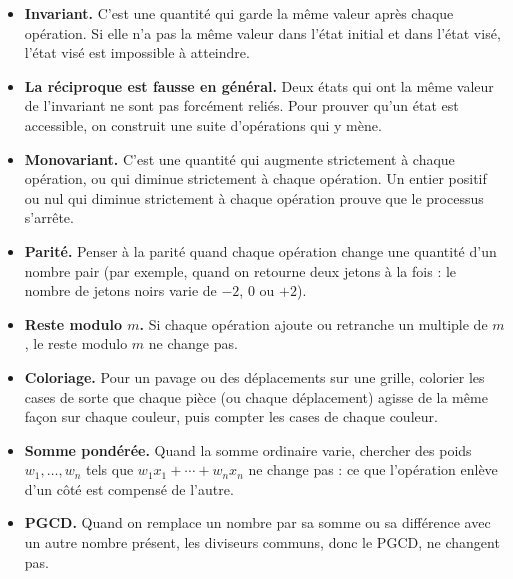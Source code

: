 \begin{itemize}
    \item \textbf{Invariant.} C'est une quantité qui garde la même valeur après
    chaque opération. Si elle n'a pas la même valeur dans l'état initial et
    dans l'état visé, l'état visé est impossible à atteindre.

    \item \textbf{La réciproque est fausse en général.} Deux états qui ont la
    même valeur de l'invariant ne sont pas forcément reliés. Pour prouver
    qu'un état est accessible, on construit une suite d'opérations qui y mène.

    \item \textbf{Monovariant.} C'est une quantité qui augmente strictement à
    chaque opération, ou qui diminue strictement à chaque opération. Un
    entier positif ou nul qui diminue strictement à chaque opération prouve que
    le processus s'arrête.

    \item \textbf{Parité.} Penser à la parité quand chaque opération change une
    quantité d'un nombre pair (par exemple, quand on retourne deux jetons à la
    fois : le nombre de jetons noirs varie de \(-2\), \(0\) ou \(+2\)).

    \item \textbf{Reste modulo \(m\).} Si chaque opération ajoute ou retranche
    un multiple de \(m\), le reste modulo \(m\) ne change pas.

    \item \textbf{Coloriage.} Pour un pavage ou des déplacements sur une
    grille, colorier les cases de sorte que chaque pièce (ou chaque
    déplacement) agisse de la même façon sur chaque couleur, puis compter les
    cases de chaque couleur.

    \item \textbf{Somme pondérée.} Quand la somme ordinaire varie, chercher des
    poids \(w_1,\dots,w_n\) tels que \(w_1x_1+\cdots+w_nx_n\) ne change pas :
    ce que l'opération enlève d'un côté est compensé de l'autre.

    \item \textbf{PGCD.} Quand on remplace un nombre par sa somme ou sa
    différence avec un autre nombre présent, les diviseurs communs, donc le
    PGCD, ne changent pas.
\end{itemize}

\begin{center}
\end{center}

